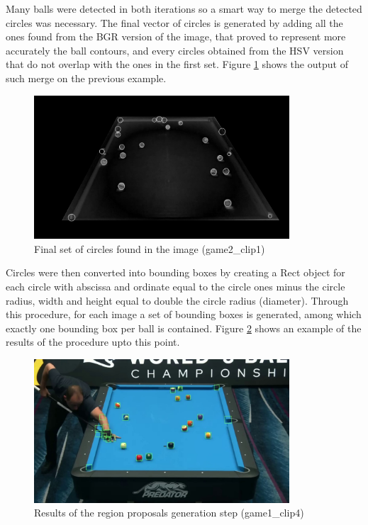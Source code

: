 Many balls were detected in both iterations so a smart way to merge the detected circles was necessary.
The final vector of circles is generated by adding all the ones found from the BGR version of the image, that proved 
to represent more accurately the ball contours, and every circles obtained from the HSV version that do not overlap with the ones
in the first set. Figure \ref{fig:circles_final} shows the output of such merge on the previous example. 
\begin{figure}[h!]
    \centering
    \includegraphics[width=0.85\textwidth]{imgs/ball_localization/circles_merged.jpg}
    \caption{Final set of circles found in the image (game2\_clip1)}
    \label{fig:circles_final}
\end{figure}

Circles were then converted into bounding boxes by creating a Rect object for each circle with abscissa and ordinate equal to the circle ones minus the circle radius,
width and height equal to double the circle radius (diameter).
Through this procedure, for each image a set of bounding boxes is generated, among which exactly one bounding box per ball is contained. 
Figure \ref{fig:fp_detection} shows an example of the results of the procedure upto this point.
\begin{figure}[h!]
    \centering
    \includegraphics[width=0.85\textwidth]{imgs/ball_localization/fp_detection.jpg}
    \caption{Results of the region proposals generation step (game1\_clip4)}
    \label{fig:fp_detection}
\end{figure}



